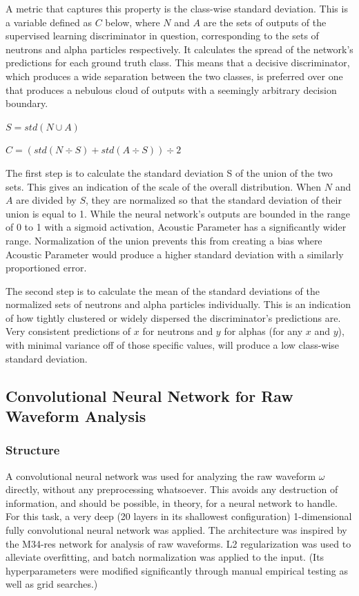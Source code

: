\documentclass[10pt]{article}
\begin{document}
A metric that captures this property is the class-wise standard deviation. This is a variable defined as $C$ below, where $N$ and $A$ are the sets of outputs of the supervised learning discriminator in question, corresponding to the sets of neutrons and alpha particles respectively. It calculates the spread of the network's predictions for each ground truth class. This means that a decisive discriminator, which produces a wide separation between the two classes, is preferred over one that produces a nebulous cloud of outputs with a seemingly arbitrary decision boundary.

$S=std(N \cup A)$

$C=(std(N \div S) + std(A \div S)) \div 2$

The first step is to calculate the standard deviation S of the union of the two sets. This gives an indication of the scale of the overall distribution. When $N$ and $A$ are divided by $S$, they are normalized so that the standard deviation of their union is equal to 1. While the neural network’s outputs are bounded in the range of 0 to 1 with a sigmoid activation, Acoustic Parameter has a significantly wider range. Normalization of the union prevents this from creating a bias where Acoustic Parameter would produce a higher standard deviation with a similarly proportioned error.

The second step is to calculate the mean of the standard deviations of the normalized sets of neutrons and alpha particles individually. This is an indication of how tightly clustered or widely dispersed the discriminator’s predictions are. Very consistent predictions of $x$ for neutrons and $y$ for alphas (for any $x$ and $y$), with minimal variance off of those specific values, will produce a low class-wise standard deviation.

\subsection{Convolutional Neural Network for Raw Waveform Analysis}

\subsubsection{Structure}

A convolutional neural network was used for analyzing the raw waveform $\omega$ directly, without any preprocessing whatsoever. This avoids any destruction of information, and should be possible, in theory, for a neural network to handle. For this task, a very deep (20 layers in its shallowest configuration) 1-dimensional fully convolutional neural network was applied. The architecture was inspired by the M34-res network \cite{verydeepconvnets} for analysis of raw waveforms. L2 regularization was used to alleviate overfitting, and batch normalization was applied to the input. (Its hyperparameters were modified significantly through manual empirical testing as well as grid searches.)
\end{document}
